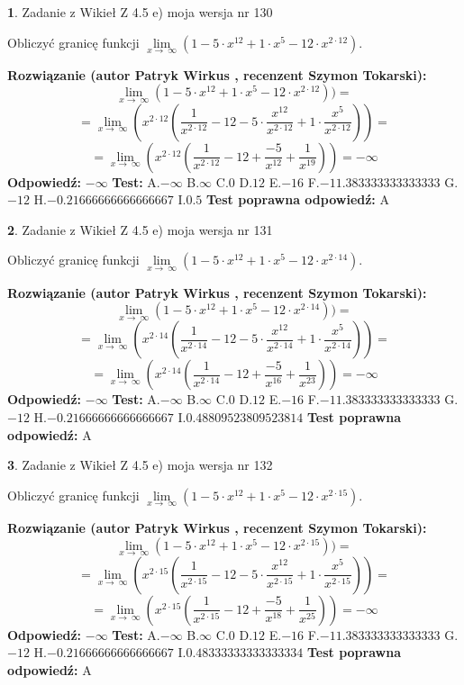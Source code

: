 \documentclass[12pt, a4paper]{article}
\theoremstyle{definition} %
\newtheorem{zad}{}
\newcommand{\zadStart}[1]{\begin{zad}#1\newline}
\newcommand{\zadStop}{\end{zad}}
\newcommand{\rozwStart}[2]{\noindent \textbf{Rozwiązanie (autor #1 , recenzent #2): }\newline}
\newcommand{\rozwStop}{\newline}
\newcommand{\odpStart}{\noindent \textbf{Odpowiedź:}\newline}
\newcommand{\odpStop}{\newline}
\newcommand{\testStart}{\noindent \textbf{Test:}\newline}
\newcommand{\testStop}{\newline}
\newcommand{\kluczStart}{\noindent \textbf{Test poprawna odpowiedź:}\newline}
\newcommand{\kluczStop}{\newline}
\begin{document}
\zadStart{Zadanie z Wikieł Z 4.5 e) moja wersja nr 130}


Obliczyć granicę funkcji  $\lim\limits_{x\to\ \infty}(1 - 5 \cdot x^{12}+1 \cdot x^{5}- 12 \cdot x^{2\cdot12})$.
\zadStop
\rozwStart{Patryk Wirkus}{Szymon Tokarski}
$$\lim\limits_{x\to\ \infty}(1 - 5 \cdot x^{12}+1 \cdot x^{5}- 12 \cdot x^{2\cdot12}))=$$
$$=\lim\limits_{x\to\ \infty}(x^{2\cdot12}(\frac{1}{x^{2\cdot12}}-12 -5 \cdot \frac{x^{12}}{x^{2\cdot12}}+1 \cdot \frac{x^{5}}{x^{2\cdot12}}))=$$
$$=\lim\limits_{x\to\ \infty}(x^{2\cdot12}(\frac{1}{x^{2\cdot12}}-12 + \frac{-5}{x^{12}}+ \frac{1}{x^{19}}))=-\infty$$
\rozwStop
\odpStart
$-\infty$
\odpStop
\testStart
A.$-\infty$ B.$\infty$ C.$0$ D.$12$ E.$-16$
F.$-11.383333333333333$ G.$-12$
H.$-0.21666666666666667$
I.$0.5$
\testStop
\kluczStart
A
\kluczStop



\zadStart{Zadanie z Wikieł Z 4.5 e) moja wersja nr 131}


Obliczyć granicę funkcji  $\lim\limits_{x\to\ \infty}(1 - 5 \cdot x^{12}+1 \cdot x^{5}- 12 \cdot x^{2\cdot14})$.
\zadStop
\rozwStart{Patryk Wirkus}{Szymon Tokarski}
$$\lim\limits_{x\to\ \infty}(1 - 5 \cdot x^{12}+1 \cdot x^{5}- 12 \cdot x^{2\cdot14}))=$$
$$=\lim\limits_{x\to\ \infty}(x^{2\cdot14}(\frac{1}{x^{2\cdot14}}-12 -5 \cdot \frac{x^{12}}{x^{2\cdot14}}+1 \cdot \frac{x^{5}}{x^{2\cdot14}}))=$$
$$=\lim\limits_{x\to\ \infty}(x^{2\cdot14}(\frac{1}{x^{2\cdot14}}-12 + \frac{-5}{x^{16}}+ \frac{1}{x^{23}}))=-\infty$$
\rozwStop
\odpStart
$-\infty$
\odpStop
\testStart
A.$-\infty$ B.$\infty$ C.$0$ D.$12$ E.$-16$
F.$-11.383333333333333$ G.$-12$
H.$-0.21666666666666667$
I.$0.48809523809523814$
\testStop
\kluczStart
A
\kluczStop



\zadStart{Zadanie z Wikieł Z 4.5 e) moja wersja nr 132}


Obliczyć granicę funkcji  $\lim\limits_{x\to\ \infty}(1 - 5 \cdot x^{12}+1 \cdot x^{5}- 12 \cdot x^{2\cdot15})$.
\zadStop
\rozwStart{Patryk Wirkus}{Szymon Tokarski}
$$\lim\limits_{x\to\ \infty}(1 - 5 \cdot x^{12}+1 \cdot x^{5}- 12 \cdot x^{2\cdot15}))=$$
$$=\lim\limits_{x\to\ \infty}(x^{2\cdot15}(\frac{1}{x^{2\cdot15}}-12 -5 \cdot \frac{x^{12}}{x^{2\cdot15}}+1 \cdot \frac{x^{5}}{x^{2\cdot15}}))=$$
$$=\lim\limits_{x\to\ \infty}(x^{2\cdot15}(\frac{1}{x^{2\cdot15}}-12 + \frac{-5}{x^{18}}+ \frac{1}{x^{25}}))=-\infty$$
\rozwStop
\odpStart
$-\infty$
\odpStop
\testStart
A.$-\infty$ B.$\infty$ C.$0$ D.$12$ E.$-16$
F.$-11.383333333333333$ G.$-12$
H.$-0.21666666666666667$
I.$0.48333333333333334$
\testStop
\kluczStart
A
\kluczStop
\end{document}
